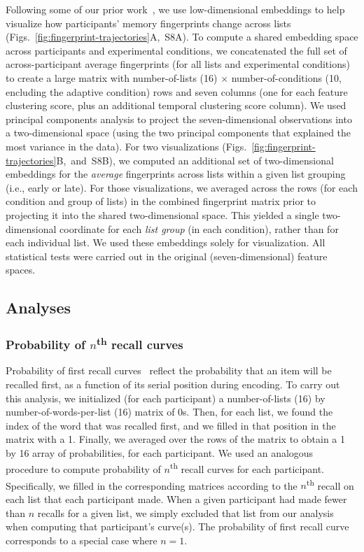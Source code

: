 \documentclass[11pt]{article}
\newcommand{\fingerprintTrajectoryRandom}{S8}
\begin{document}
Following some of our prior work~\citep{HeusEtal18a, HeusEtal21, MannEtal22},
we use low-dimensional embeddings to help visualize how participants' memory
fingerprints change across lists
(Figs.~\ref{fig:fingerprint-trajectories}A,~\fingerprintTrajectoryRandom A). To
compute a shared embedding space across participants and experimental
conditions, we concatenated the full set of across-participant average
fingerprints (for all lists and experimental conditions) to create a large
matrix with number-of-lists (16) $\times$ number-of-conditions (10, encluding
the adaptive condition) rows and seven columns (one for each feature clustering
score, plus an additional temporal clustering score column). We used principal
components analysis to project the seven-dimensional observations into a
two-dimensional space (using the two principal components that explained the
most variance in the data). For two visualizations
(Figs.~\ref{fig:fingerprint-trajectories}B,~and~\fingerprintTrajectoryRandom B),
we computed an additional set of two-dimensional embeddings for the
\textit{average} fingerprints across lists within a given list grouping (i.e.,
early or late). For those visualizations, we averaged across the rows (for each
condition and group of lists) in the combined fingerprint matrix prior to
projecting it into the shared two-dimensional space. This yielded a single
two-dimensional coordinate for each \textit{list group} (in each condition),
rather than for each individual list. We used these embeddings solely for
visualization. All statistical tests were carried out in the original
(seven-dimensional) feature spaces.

\subsection*{Analyses}

\subsubsection*{Probability of $n$\textsuperscript{th} recall curves}

Probability of first recall curves~\citep{AtkiShif68, PostPhil65, WelcBurn24}
reflect the probability that an item will be recalled first, as a function of
its serial position during encoding. To carry out this analysis, we initialized
(for each participant) a number-of-lists (16) by number-of-words-per-list (16)
matrix of 0s. Then, for each list, we found the index of the word that was
recalled first, and we filled in that position in the matrix with a 1. Finally,
we averaged over the rows of the matrix to obtain a 1 by 16 array of
probabilities, for each participant. We used an analogous procedure to compute
probability of $n$\textsuperscript{th} recall curves for each participant.
Specifically, we filled in the corresponding matrices according to the
$n$\textsuperscript{th} recall on each list that each participant made. When a
given participant had made fewer than $n$ recalls for a given list, we simply
excluded that list from our analysis when computing that participant's
curve(s). The probability of first recall curve corresponds to a special case
where $n = 1$.
\end{document}
